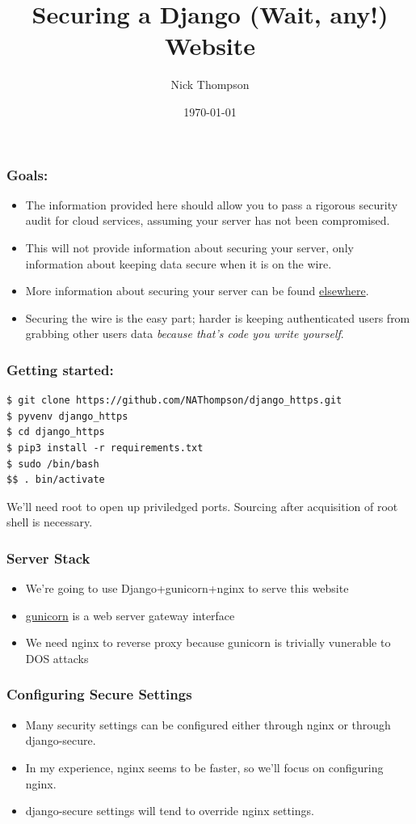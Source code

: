 \documentclass[9pt]{beamer}
\begin{document}
\title{Securing a Django (Wait, any!) Website}
\author{Nick Thompson} 
\date{\today}

\frame{\titlepage}

\begin{frame}[fragile]
\frametitle{Goals:}

\begin{itemize}
\item The information provided here should allow you to pass a rigorous security audit for cloud services, assuming your server has not been compromised.
\pause
\item This will not provide information about securing your server, only information about keeping data secure when it is on the wire.
\pause
\item More information about securing your server can be found \href{https://www.thefanclub.co.za/how-to/how-secure-ubuntu-1204-lts-server-part-1-basics}{elsewhere}.
\pause
\item Securing the wire is the easy part; harder is keeping authenticated users from grabbing other users data \emph{because that's code you write yourself}.
\end{itemize}
\end{frame}


\begin{frame}[fragile]
\frametitle{Getting started:}
\begin{verbatim}
$ git clone https://github.com/NAThompson/django_https.git
$ pyvenv django_https
$ cd django_https
$ pip3 install -r requirements.txt
$ sudo /bin/bash
$$ . bin/activate
\end{verbatim}
\pause
We'll need root to open up priviledged ports. Sourcing after acquisition of root shell is necessary.
\end{frame}

\begin{frame}
\frametitle{Server Stack}
\begin{itemize}
\item We're going to use Django+gunicorn+nginx to serve this website
\pause
\item \href{http://gunicorn.org/\#deployment}{gunicorn} is a web server gateway interface
\pause
\item We need nginx to reverse proxy because gunicorn is trivially vunerable to DOS attacks
\pause
\end{itemize}
\end{frame}

\begin{frame}[fragile]
\frametitle{Configuring Secure Settings}
\begin{itemize}
\item Many security settings can be configured either through nginx or through django-secure.
\pause
\item In my experience, nginx seems to be faster, so we'll focus on configuring nginx.
\pause 
\item django-secure settings will tend to override nginx settings.
\end{itemize}
\end{frame}
\end{document}
